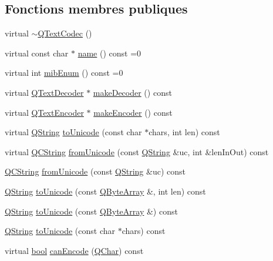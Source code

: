 \subsection*{Fonctions membres publiques}
\begin{DoxyCompactItemize}
\item 
virtual \hyperlink{class_q_text_codec_af84836a011269c9eb67241cf8c638d83}{$\sim$\+Q\+Text\+Codec} ()
\item 
virtual const char $\ast$ \hyperlink{class_q_text_codec_ab4e991cacb9c6acff167c4f8d4f2ec3e}{name} () const  =0
\item 
virtual int \hyperlink{class_q_text_codec_a237e62722c97fb1fba989d746142ec1f}{mib\+Enum} () const  =0
\item 
virtual \hyperlink{class_q_text_decoder}{Q\+Text\+Decoder} $\ast$ \hyperlink{class_q_text_codec_a093251759df51159cd3c01f45aeffaac}{make\+Decoder} () const 
\item 
virtual \hyperlink{class_q_text_encoder}{Q\+Text\+Encoder} $\ast$ \hyperlink{class_q_text_codec_a27628237031589bbaf95d3f4b4e7d7db}{make\+Encoder} () const 
\item 
virtual \hyperlink{class_q_string}{Q\+String} \hyperlink{class_q_text_codec_a11752c64a75df331b762788ced77ab28}{to\+Unicode} (const char $\ast$chars, int len) const 
\item 
virtual \hyperlink{class_q_c_string}{Q\+C\+String} \hyperlink{class_q_text_codec_ab3a6895c8e6294658802214657dbeac3}{from\+Unicode} (const \hyperlink{class_q_string}{Q\+String} \&uc, int \&len\+In\+Out) const 
\item 
\hyperlink{class_q_c_string}{Q\+C\+String} \hyperlink{class_q_text_codec_ae79e990e978568bbd38836f2a74a2f43}{from\+Unicode} (const \hyperlink{class_q_string}{Q\+String} \&uc) const 
\item 
\hyperlink{class_q_string}{Q\+String} \hyperlink{class_q_text_codec_a6529fbf00d8ba1bd6c9eb3410ca76261}{to\+Unicode} (const \hyperlink{qcstring_8h_ad6a390648110655c217fe072d45fbcf5}{Q\+Byte\+Array} \&, int len) const 
\item 
\hyperlink{class_q_string}{Q\+String} \hyperlink{class_q_text_codec_afce1853f08348b72cda57fef17c711cb}{to\+Unicode} (const \hyperlink{qcstring_8h_ad6a390648110655c217fe072d45fbcf5}{Q\+Byte\+Array} \&) const 
\item 
\hyperlink{class_q_string}{Q\+String} \hyperlink{class_q_text_codec_a3359a38b580b0a67fd1d7cc37872523f}{to\+Unicode} (const char $\ast$chars) const 
\item 
virtual \hyperlink{qglobal_8h_a1062901a7428fdd9c7f180f5e01ea056}{bool} \hyperlink{class_q_text_codec_aa3dde30de6e7a9d9c9e1d3a49d707ff7}{can\+Encode} (\hyperlink{class_q_char}{Q\+Char}) const 

\end{DoxyCompactItemize}
